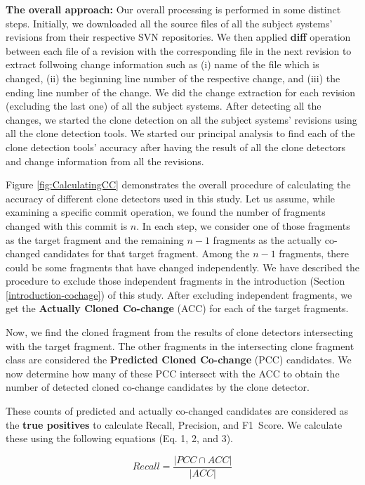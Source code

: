 \documentclass[review]{elsarticle}
\begin{document}
\textbf{The overall approach:} Our overall processing is performed in some distinct steps.  Initially, we downloaded all the source files of all the subject systems' revisions from their respective SVN repositories. We then applied \textbf{diff} operation between each file of a revision with the corresponding file in the next revision to extract follwoing change information such as (i) name of the file which is changed, (ii) the beginning line number of the respective change, and (iii) the ending line number of the change. We did the change extraction for each revision (excluding the last one) of all the subject systems. After detecting all the changes, we started the clone detection on all the subject systems' revisions using all the clone detection tools. We started our principal analysis to find each of the clone detection tools' accuracy after having the result of all the clone detectors and change information from all the revisions. 

Figure \ref{fig:CalculatingCC} demonstrates the overall procedure of calculating the accuracy of different clone detectors used in this study. Let us assume, while examining a specific commit operation, we found the number of fragments changed with this commit is $n$. In each step, we consider one of those fragments as the target fragment and the remaining $n-1$ fragments as the actually co-changed candidates for that target fragment. Among the $n-1$ fragments, there could be some fragments that have changed independently. We have described the procedure to exclude those independent fragments in the introduction (Section \ref{introduction-cochage}) of this study. After excluding independent fragments, we get the \textbf{Actually Cloned Co-change} (ACC) for each of the target fragments. 

Now, we find the cloned fragment from the results of clone detectors intersecting with the target fragment. The other fragments in the intersecting clone fragment class are considered the \textbf{Predicted Cloned Co-change} (PCC) candidates. We now determine how many of these PCC intersect with the ACC to obtain the number of detected cloned co-change candidates by the clone detector. 

These counts of predicted and actually co-changed candidates are considered as the \textbf{true positives} to calculate Recall, Precision, and F1~Score. We calculate these using the following equations (Eq. 1, 2, and 3). 

\begin{equation}
    Recall = \frac{|PCC \cap ACC|}{|ACC|}
\end{equation}
\end{document}

